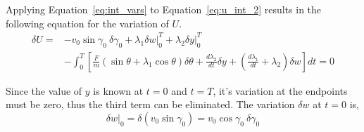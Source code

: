 Applying Equation~\eqref{eq:int_vars} to Equation~\eqref{eq:u_int_2} results in the following equation for the variation of $U$.
\begin{align}
    \label{eq:delta_u_int_1}
    \delta U = &-v_0\sin{\gamma_0}\ \delta \gamma_0 + \lambda_1 \delta w \bigg|_0^T + \lambda_2 \delta y \bigg|_0^T \\
               &- \int_0^T\left[\frac{F}{m} \left(\sin{\theta} + \lambda_1\cos{\theta}\right) \delta \theta
                               + \frac{d\lambda_2}{dt} \delta y 
                               + \left(\frac{d\lambda_1}{dt} + \lambda_2\right) \delta w\right] dt = 0 \nonumber
\end{align}

Since the value of $y$ is known at $t=0$ and $t=T$, it's variation at the endpoints must be zero, thus the third term can be eliminated. The variation $\delta w$ at $t=0$ is,
\begin{equation}
    \delta w \bigg|_0=\delta (v_0 \sin \gamma_0) = v_0 \cos \gamma_0\ \delta \gamma_0
\end{equation}

